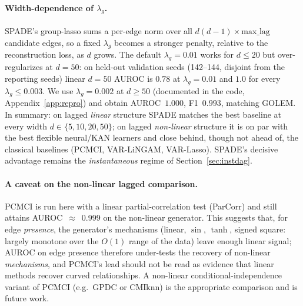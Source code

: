 \paragraph{Width-dependence of $\lambda_g$.} SPADE's group-lasso sums a per-edge
norm over all $d(d{-}1)\times\text{max\_lag}$ candidate edges, so a fixed
$\lambda_g$ becomes a stronger penalty, relative to the reconstruction loss, as
$d$ grows. The default $\lambda_g{=}0.01$ works for $d\le20$ but over-regularizes
at $d{=}50$: on held-out validation seeds (142--144, disjoint from the reporting
seeds) linear $d{=}50$ AUROC is $0.78$ at $\lambda_g{=}0.01$ and $1.0$ for every
$\lambda_g\le0.003$. We use $\lambda_g{=}0.002$ at $d\ge50$ (documented in the
code, Appendix~\ref{app:repro}) and obtain AUROC~$1.000$, F1~$0.993$, matching
GOLEM. In summary: on lagged \emph{linear} structure SPADE matches the best
baseline at every width $d\in\{5,10,20,50\}$; on lagged \emph{non-linear}
structure it is on par with the best flexible neural/KAN learners and close
behind, though not ahead of, the classical baselines (PCMCI, VAR-LiNGAM,
VAR-Lasso). SPADE's decisive advantage remains the \emph{instantaneous} regime of
Section~\ref{sec:instdag}.

\paragraph{A caveat on the non-linear lagged comparison.} PCMCI is run here with a
linear partial-correlation test (ParCorr) and still attains AUROC~$\approx$~0.999
on the non-linear generator. This suggests that, for edge \emph{presence}, the
generator's mechanisms (linear, $\sin$, $\tanh$, signed square: largely monotone
over the $O(1)$ range of the data) leave enough linear signal; AUROC on edge
presence therefore under-tests the recovery of non-linear \emph{mechanisms}, and
PCMCI's lead should not be read as evidence that linear methods recover curved
relationships. A non-linear conditional-independence variant of PCMCI (e.g.\ GPDC
or CMIknn) is the appropriate comparison and is future work.

